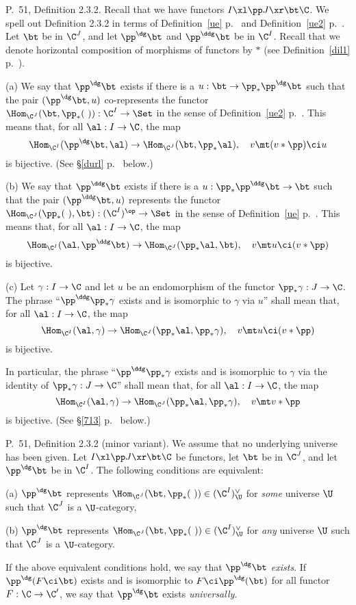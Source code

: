 \documentclass[12pt]{article}
\theoremstyle{remark}
\theoremstyle{definition}
\begin{document}
\begin{s} 
P.~51, Definition 2.3.2. Recall that we have functors $I\xl\pp J\xr\bt\C$. We spell out Definition 2.3.2 in terms of Definition~\ref{ue} p.~ and Definition~\ref{ue2} p.~. Let $\bt$ be in $\C^J$, and let $\pp^\dg\bt$ and $\pp^\ddg\bt$ be in $\C^I$. Recall that we denote horizontal composition of morphisms of functors by $*$ (see Definition~\ref{dil1} p.~).

\nn(a) We say that $\pp^\dg\bt$ exists if there is a $u:\bt\to\pp_*\pp^\dg\bt$ such that the pair $(\pp^\dg\bt,u)$ co-represents the functor $\Hom_{\C^J}(\bt,\pp_*(\ )):\C^I\to\Set$ in the sense of Definition~\ref{ue2} p.~. This means that, for all $\al:I\to\C$, the map 
$$
\Hom_{\C^I}(\pp^\dg\bt,\al)\to\Hom_{\C^J}(\bt,\pp_*\al),\quad v\mt(v*\pp)\ci u
$$ 
is bijective. (See \S\ref{durl} p.~ below.)

\nn(b) We say that $\pp^\ddg\bt$ exists if there is a $u:\pp_*\pp^\ddg\bt\to\bt$ such that the pair $(\pp^\ddg\bt,u)$ represents the functor $\Hom_{\C^J}(\pp_*(\ ),\bt):(\C^I)^{\op}\to\Set$ in the sense of Definition~\ref{ue} p.~. This means that, for all $\al:I\to\C$, the map 
$$
\Hom_{\C^I}(\al,\pp^\ddg\bt)\to\Hom_{\C^J}(\pp_*\al,\bt),\quad v\mt u\ci(v*\pp)
$$ 
is bijective.

\nn(c) Let $\gamma:I\to\C$ and let $u$ be an endomorphism of the functor $\pp_*\gamma:J\to\C$. The phrase ``$\pp^\ddg\pp_*\gamma$ exists and is isomorphic to $\gamma$ via $u$'' shall mean that, for all $\al:I\to\C$, the map 
$$
\Hom_{\C^I}(\al,\gamma)\to\Hom_{\C^J}(\pp_*\al,\pp_*\gamma),\quad v\mt u\ci(v*\pp)
$$ 
is bijective. 

In particular, the phrase ``$\pp^\ddg\pp_*\gamma$ exists and is isomorphic to $\gamma$ via the identity of $\pp_*\gamma:J\to\C$'' shall mean that, for all $\al:I\to\C$, the map 
$$
\Hom_{\C^I}(\al,\gamma)\to\Hom_{\C^J}(\pp_*\al,\pp_*\gamma),\quad v\mt v*\pp
$$ 
is bijective. (See \S\ref{713} p.~ below.)
\end{s}

%

\begin{s} 
P.~51, Definition 2.3.2 (minor variant). We assume that no underlying universe has been given. Let $I\xl\pp J\xr\bt\C$ be functors, let $\bt$ be in $\C^J$, and let $\pp^\dg\bt$ be in $\C^I$. The following conditions are equivalent:

\nn(a) $\pp^\dg\bt$ represents $\Hom_{\C^J}(\bt,\pp_*(\ ))\in(\C^I)^\vee_\U$ for \emph{some} universe $\U$ such that $\C^J$ is a $\U$-category,

\nn(b) $\pp^\dg\bt$ represents $\Hom_{\C^J}(\bt,\pp_*(\ ))\in(\C^I)^\vee_\U$ for \emph{any} universe $\U$ such that $\C^J$ is a $\U$-category. 

\begin{df}[Definition 2.3.2 p. 51] 
If the above equivalent conditions hold, we say that $\pp^\dg\bt$ {\em exists}. If $\pp^\dg(F\ci\bt)$ exists and is isomorphic to $F\ci\pp^\dg(\bt)$ for all functor $F:\C\to\C'$, we say that $\pp^\dg\bt$ exists {\em universally}.
\end{df} 
\end{s}
\end{document}
